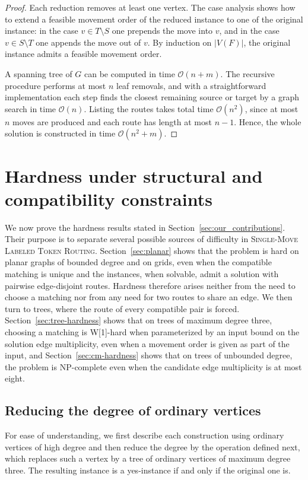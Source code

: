 \documentclass[a4paper,USenglish,thm-restate]{lipics-v2021}
\theoremstyle{problemstyle}
\begin{document}
\begin{proof}
Each reduction removes at least one vertex. The case analysis shows how to
extend a feasible movement order of the reduced instance to one of the original
instance: in the case $v\in T\setminus S$ one prepends the move into $v$, and in
the case $v\in S\setminus T$ one appends the move out of $v$. By induction on
$|V(F)|$, the original instance admits a feasible movement order.

A spanning tree of $G$ can be computed in time $\mathcal{O}(n+m)$. The recursive
procedure performs at most $n$ leaf removals, and with a straightforward
implementation each step finds the closest remaining source or target by a graph
search in time $\mathcal{O}(n)$. Listing the routes takes total time
$\mathcal{O}(n^2)$, since at most $n$ moves are produced and each route has
length at most $n-1$. Hence, the whole solution is constructed in time
$\mathcal{O}(n^2+m)$.
\end{proof}


\section{Hardness under structural and compatibility constraints}
\label{sec:hardness}

We now prove the hardness results stated in Section~\ref{sec:our_contributions}.
Their purpose is to separate several possible sources of difficulty in
\textsc{Single-Move Labeled Token Routing}. Section~\ref{sec:planar} shows
that the problem is hard on planar graphs of bounded degree and on grids,
even when the compatible matching is unique and the instances, when
solvable, admit a solution with pairwise edge-disjoint routes. Hardness
therefore arises neither from the need to choose a matching nor from any
need for two routes to share an edge. We then turn to trees, where the
route of every compatible pair is forced. Section~\ref{sec:tree-hardness}
shows that on trees of maximum degree three, choosing a matching is
\textsf{W}[1]-hard when parameterized by an input bound on the solution edge
multiplicity, even when a movement order is given as part of the input, and
Section~\ref{sec:cm-hardness} shows that on trees of unbounded degree, the
problem is \textsf{NP}-complete even when the candidate edge multiplicity is
at most eight.

\subsection{Reducing the degree of ordinary vertices}
\label{sec:degree-reduction}
For ease of understanding, we first describe each construction using ordinary
vertices of high degree and then reduce the degree by the operation defined
next, which replaces such a vertex by a tree of ordinary vertices of maximum
degree three. The resulting instance is a yes-instance if and only if the
original one is.
\end{document}
